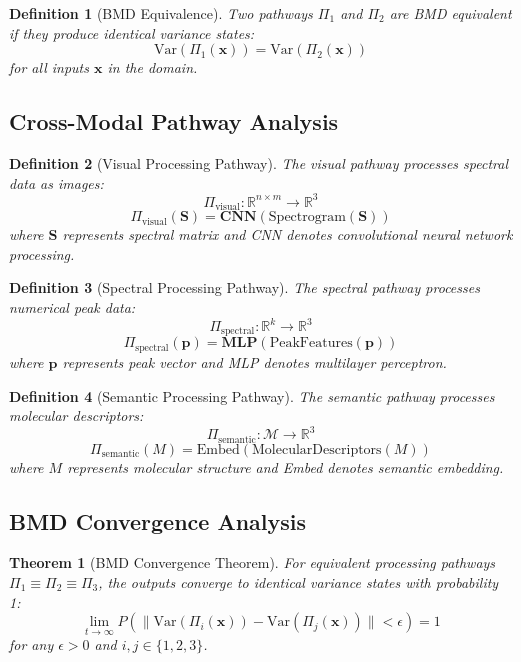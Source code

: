 \documentclass[12pt,a4paper]{article}
\newtheorem{theorem}{Theorem}
\newtheorem{definition}{Definition}
\begin{document}
\begin{definition}[BMD Equivalence]
Two pathways $\Pi_1$ and $\Pi_2$ are BMD equivalent if they produce identical variance states:
$$\text{Var}(\Pi_1(\mathbf{x})) = \text{Var}(\Pi_2(\mathbf{x}))$$
for all inputs $\mathbf{x}$ in the domain.
\end{definition}

\subsection{Cross-Modal Pathway Analysis}

\begin{definition}[Visual Processing Pathway]
The visual pathway processes spectral data as images:
$$\Pi_{\text{visual}}: \mathbb{R}^{n \times m} \rightarrow \mathbb{R}^3$$
$$\Pi_{\text{visual}}(\mathbf{S}) = \mathbf{CNN}(\text{Spectrogram}(\mathbf{S}))$$
where $\mathbf{S}$ represents spectral matrix and CNN denotes convolutional neural network processing.
\end{definition}

\begin{definition}[Spectral Processing Pathway]
The spectral pathway processes numerical peak data:
$$\Pi_{\text{spectral}}: \mathbb{R}^k \rightarrow \mathbb{R}^3$$
$$\Pi_{\text{spectral}}(\mathbf{p}) = \mathbf{MLP}(\text{PeakFeatures}(\mathbf{p}))$$
where $\mathbf{p}$ represents peak vector and MLP denotes multilayer perceptron.
\end{definition}

\begin{definition}[Semantic Processing Pathway]
The semantic pathway processes molecular descriptors:
$$\Pi_{\text{semantic}}: \mathcal{M} \rightarrow \mathbb{R}^3$$
$$\Pi_{\text{semantic}}(M) = \text{Embed}(\text{MolecularDescriptors}(M))$$
where $M$ represents molecular structure and Embed denotes semantic embedding.
\end{definition}

\subsection{BMD Convergence Analysis}

\begin{theorem}[BMD Convergence Theorem]
For equivalent processing pathways $\Pi_1 \equiv \Pi_2 \equiv \Pi_3$, the outputs converge to identical variance states with probability 1:
$$\lim_{t \to \infty} P(\|\text{Var}(\Pi_i(\mathbf{x})) - \text{Var}(\Pi_j(\mathbf{x}))\| < \epsilon) = 1$$
for any $\epsilon > 0$ and $i,j \in \{1,2,3\}$.
\end{theorem}
\end{document}
